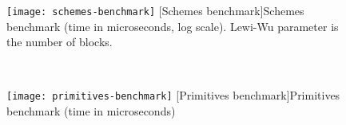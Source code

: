 \begin{figure}[!ht]
	\centering
	\begin{minipage}[t]{0.48\columnwidth}
		\captionsetup[figure]{justification=centering}
		\centering
		\texttt{[image: schemes-benchmark]}
		[Schemes benchmark]{Schemes benchmark (time in microseconds, log scale). Lewi-Wu parameter is the number of blocks.}%
		\label{figure:benchmarks:schemes}
	\end{minipage}
	~ %
	\begin{minipage}[t]{0.48\columnwidth}
		\captionsetup[figure]{justification=centering}
		\centering
		\texttt{[image: primitives-benchmark]}
		[Primitives benchmark]{Primitives benchmark (time in microseconds)}%
		\label{figure:benchmarks:primitives}
	\end{minipage}
\end{figure}
